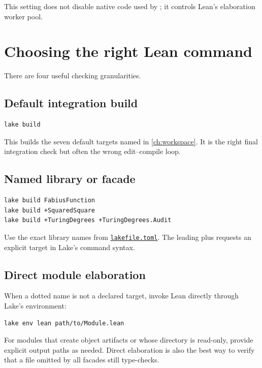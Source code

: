 \documentclass[
  10pt,
  a4paper,
  twoside,
  open=any,
  parskip=half,
  headings=big
]{scrreprt}
\newcommand{\CommitFull}{56a402bf82a9aab119fcbe3e96b991d387b221c5}
\newcommand{\RepoWeb}{https://github.com/VladimirReshetnikov/ProveIt}
\newcommand{\RepoBlobBase}{\RepoWeb/blob/\CommitFull}
\newcommand{\code}[1]{\texttt{\detokenize{#1}}}
\newcommand{\RepoFile}[1]{\href{\RepoBlobBase/#1}{\nolinkurl{#1}}}
\begin{document}
This setting does not disable native code used by \code{native_decide}; it controls Lean's elaboration worker pool.

\section{Choosing the right Lean command}

There are four useful checking granularities.

\subsection{Default integration build}

\begin{lstlisting}[language=bash]
lake build
\end{lstlisting}

This builds the seven default targets named in \cref{ch:workspace}. It is the right final integration check but often the wrong edit--compile loop.

\subsection{Named library or facade}

\begin{lstlisting}[language=bash]
lake build FabiusFunction
lake build +SquaredSquare
lake build +TuringDegrees +TuringDegrees.Audit
\end{lstlisting}

Use the exact library names from \RepoFile{lakefile.toml}. The leading plus requests an explicit target in Lake's command syntax.

\subsection{Direct module elaboration}

When a dotted name is not a declared target, invoke Lean directly through Lake's environment:

\begin{lstlisting}[language=bash]
lake env lean path/to/Module.lean
\end{lstlisting}

For modules that create object artifacts or whose directory is read-only, provide explicit output paths as needed. Direct elaboration is also the best way to verify that a file omitted by all facades still type-checks.
\end{document}
